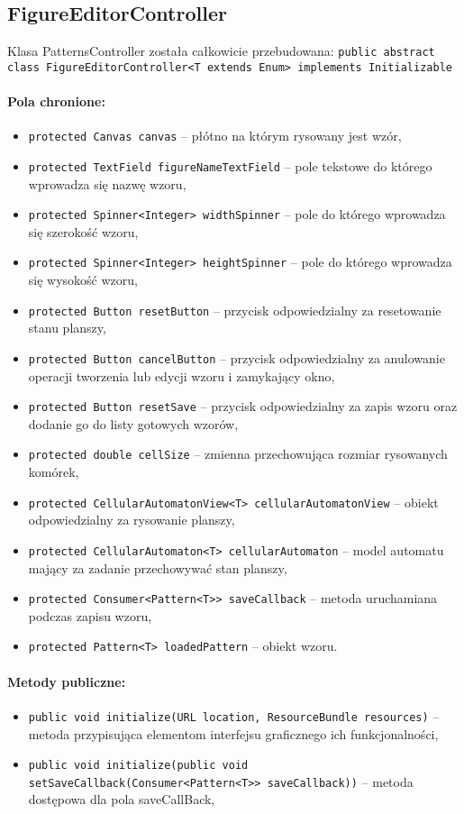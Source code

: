 \documentclass{mwart}
\begin{document}
\subsection{FigureEditorController}
Klasa PatternsController została całkowicie przebudowana:
\texttt{public abstract class FigureEditorController<T extends Enum> implements Initializable}
\paragraph{Pola chronione:}
\begin{itemize}
	\item \texttt{protected Canvas canvas} -- płótno na którym rysowany jest wzór,
	\item \texttt{protected TextField figureNameTextField} -- pole tekstowe do którego wprowadza się nazwę wzoru,
	\item \texttt{protected Spinner<Integer> widthSpinner} -- pole do którego wprowadza się szerokość wzoru,
	\item \texttt{protected Spinner<Integer> heightSpinner} -- pole do którego wprowadza się wysokość wzoru,
	\item \texttt{protected Button resetButton} -- przycisk odpowiedzialny za resetowanie stanu planszy,
	\item \texttt{protected Button cancelButton} -- przycisk odpowiedzialny za anulowanie operacji tworzenia lub edycji wzoru i zamykający okno,
	\item \texttt{protected Button resetSave} -- przycisk odpowiedzialny za zapis wzoru oraz dodanie go do listy gotowych wzorów,
	\item \texttt{protected double cellSize} -- zmienna przechowująca rozmiar rysowanych komórek,
	\item \texttt{protected CellularAutomatonView<T> cellularAutomatonView} -- obiekt odpowiedzialny za rysowanie planszy,
	\item \texttt{protected CellularAutomaton<T> cellularAutomaton} -- model automatu mający za zadanie przechowywać stan planszy,
	\item \texttt{protected Consumer<Pattern<T>> saveCallback} -- metoda uruchamiana podczas zapisu wzoru,
	\item \texttt{protected Pattern<T> loadedPattern} -- obiekt wzoru.
	
\end{itemize}
\paragraph{Metody publiczne:}
\begin{itemize}
	\item \texttt{public void initialize(URL location, ResourceBundle resources)} -- metoda przypisująca elementom interfejsu graficznego ich funkcjonalności,
	\item \texttt{public void initialize(public void setSaveCallback(Consumer<Pattern<T>> saveCallback))} -- metoda dostępowa dla pola saveCallBack,
\end{itemize}
\end{document}
